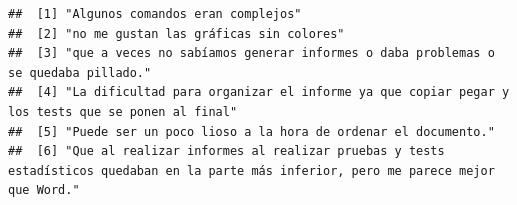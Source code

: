\documentclass[
]{article}
\newenvironment{Shaded}{\begin{snugshade}}{\end{snugshade}}
\newcommand{\CommentTok}[1]{\textcolor[rgb]{0.56,0.35,0.01}{\textit{#1}}}
\newcommand{\NormalTok}[1]{#1}
\newcommand{\SpecialCharTok}[1]{\textcolor[rgb]{0.81,0.36,0.00}{\textbf{#1}}}
\begin{document}
\begin{Shaded}
\end{Shaded}

\begin{verbatim}
##  [1] "Algunos comandos eran complejos"                                                                                                                                                                                                                                                                                                                                                                        
##  [2] "no me gustan las gráficas sin colores"                                                                                                                                                                                                                                                                                                                                                                  
##  [3] "que a veces no sabíamos generar informes o daba problemas o se quedaba pillado."                                                                                                                                                                                                                                                                                                                        
##  [4] "La dificultad para organizar el informe ya que copiar pegar y los tests que se ponen al final"                                                                                                                                                                                                                                                                                                          
##  [5] "Puede ser un poco lioso a la hora de ordenar el documento."                                                                                                                                                                                                                                                                                                                                             
##  [6] "Que al realizar informes al realizar pruebas y tests estadísticos quedaban en la parte más inferior, pero me parece mejor que Word."                                                                                                                                                                                                                                                                    

\end{verbatim}
\end{document}
